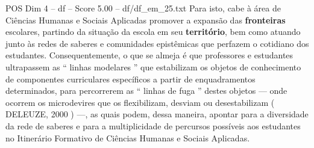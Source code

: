 \begin{textsample}{POS Dim 4 – df – Score 5.00 – df/df\_em\_25.txt}
Para isto, cabe à área de Ciências Humanas e Sociais Aplicadas promover a expansão das \textbf{fronteiras} escolares, partindo da situação da escola em seu \textbf{território}, bem como atuando junto às redes de saberes e comunidades epistêmicas que perfazem o cotidiano dos estudantes.
Consequentemente, o que se almeja é que professores e estudantes ultrapassem as “ linhas modelares ” que estabilizam os objetos de conhecimento de componentes curriculares específicos a partir de enquadramentos determinados, para percorrerem as “ linhas de fuga ” destes objetos — onde ocorrem os microdevires que os flexibilizam, desviam ou desestabilizam ( DELEUZE, 2000 ) —, as quais podem, dessa maneira, apontar para a diversidade da rede de saberes e para a multiplicidade de percursos possíveis aos estudantes no Itinerário Formativo de Ciências Humanas e Sociais Aplicadas.

\end{textsample}
